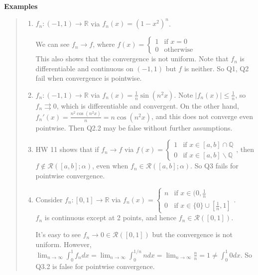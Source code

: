 \documentclass[11pt]{article}
\begin{document}
\textbf{Examples}
\begin{quote}\vspace{-0.3cm}
	\begin{enumerate}
	\item $f_n : (-1, 1) \to \mathbb{R}$ via $f_n(x) = (1-x^2)^n$.

	We can see $f_n \to f$, where $f(x) = \begin{cases}
	1 & \text{if } x = 0\\
	0 & \text{otherwise}
	\end{cases}$\\
	This also shows that the convergence is not uniform. Note that $f_n$ is differentiable and continuous on $(-1, 1)$ but $f$ is neither. So Q1, Q2 fail when convergence is pointwise.

	\item $f_n : (-1, 1) \to \mathbb{R}$ via $f_n(x) = \frac{1}{n} \sin(n^2x)$. Note $|f_n(x)| \leq \frac{1}{n}$, so $f_n \rightrightarrows 0$, which is differentiable and convergent.
	On the other hand, $f_n'(x) = \frac{n^2 \cos(n^2x)}{n} = n \cos (n^2x)$, and this does not converge even pointwise. Then Q2.2 may be false without further assumptions.

	\item HW 11 shows that if $f_n \to f$ via $f(x) = \begin{cases}
	1 & \text{if } x \in [a,b] \cap \mathbb{Q}\\
	0 & \text{if } x \in [a,b] \backslash \mathbb{Q}
	\end{cases}$,
	then $f \notin \mathcal{R}([a,b]; \alpha)$, even when $f_n \in \mathcal{R}([a,b]; \alpha)$. So Q3 fails for pointwise convergence.

	\item Consider $f_n : [0,1] \to \mathbb{R}$ via $f_n(x) = \begin{cases}
	n & \text{if } x \in (0, \frac{1}{n}\\
	0 & \text{if } x \in \{0\} \cup [\frac{1}{n}, 1]
	\end{cases}$.\\
	$f_n$ is continuous except at 2 points, and hence $f_n \in \mathcal{R}([0,1])$.

	It's easy to see $f_n \to 0 \in \mathcal{R}([0,1])$ but the convergence is not uniform. However, $\lim_{n \to \infty} \int_0^1 f_n dx = \lim_{n \to \infty} \int_0^{1/n} n dx = \lim_{n \to \infty} \frac{n}{n} = 1 \neq \int_0^1 0 dx$. So Q3.2 is false for pointwise convergence.
	\end{enumerate}
\end{quote}
\end{document}
